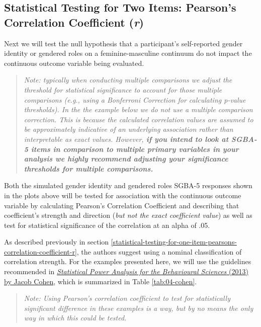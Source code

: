 \documentclass[
]{book}
\begin{document}
\subsection{\texorpdfstring{Statistical Testing for Two Items: Pearson's Correlation Coefficient (\emph{r})}{Statistical Testing for Two Items: Pearson's Correlation Coefficient (r)}}\label{statistical-testing-for-two-items-pearsons-correlation-coefficient-r}

Next we will test the null hypothesis that a participant's self-reported gender identity or gendered roles on a feminine-masculine continuum do not impact the continuous outcome variable being evaluated.

\begin{quote}
\emph{Note: typically when conducting multiple comparisons we adjust the threshold for statistical significance to account for those multiple comparisons (e.g., using a Bonferroni Correction for calculating p-value thresholds). In the the example below we do not use a multiple comparison correction. This is because the calculated correlation values are assumed to be approximately indicative of an underlying association rather than interpretable as exact values. However, \textbf{if you intend to look at SGBA-5 items in comparison to multiple primary variables in your analysis we highly recommend adjusting your significance thresholds for multiple comparisons.}}
\end{quote}

Both the simulated gender identity and gendered roles SGBA-5 responses shown in the plots above will be tested for association with the continuous outcome variable by calculating Pearson's Correlation Coefficient and describing that coefficient's strength and direction (\emph{{but not the exact coefficient value}}) as well as test for statistical significance of the correlation at an alpha of .05.

As described previously in section \ref{statistical-testing-for-one-item-pearsons-correlation-coefficient-r}, the authors suggest using a nominal classification of correlation strength. For the examples presented here, we will use the guidelines recommended in \href{https://doi.org/10.4324/9780203771587}{\emph{Statistical Power Analysis for the Behavioural Sciences} (2013) by Jacob Cohen}, which is summarized in Table \ref{tab:04-cohen}.

\begin{quote}
\emph{Note: Using Pearson's correlation coefficient to test for statistically significant difference in these examples is a way, but by no means the only way in which this could be tested.}
\end{quote}
\end{document}
